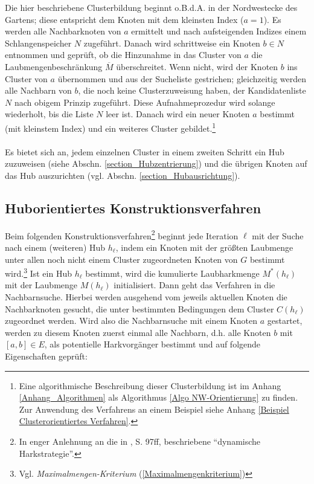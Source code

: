 \documentclass[fontsize=12pt,doubleside,openany,listof=totoc,listof=flat,listof=nochaptergap,numbers=noenddot]{scrbook}
\theoremstyle{style}
\begin{document}
Die hier beschriebene Clusterbildung beginnt o.B.d.A. in der Nordwestecke des Gartens; diese entspricht dem Knoten mit dem kleinsten Index ($a=1$). Es werden alle Nachbarknoten von $a$ ermittelt und nach aufsteigenden Indizes einem Schlangenspeicher $N$ zugeführt. Danach wird schrittweise ein Knoten $b \in N$ entnommen und geprüft, ob die Hinzunahme in das Cluster von $a$ die Laubmengenbeschränkung $\overline{M}$ überschreitet. Wenn nicht, wird der Knoten $b$ ins Cluster von $a$ übernommen und aus der Sucheliste gestrichen; gleichzeitig werden alle Nachbarn von $b$, die noch keine Clusterzuweisung haben, der Kandidatenliste $N$ nach obigem Prinzip zugeführt. Diese Aufnahmeprozedur wird solange wiederholt, bis die Liste $N$ leer ist. Danach wird ein neuer Knoten $a$ bestimmt (mit kleinstem Index) und ein weiteres Cluster gebildet.\footnote{Eine algorithmische Beschreibung dieser Clusterbildung ist im Anhang \ref{Anhang_Algorithmen} als Algorithmus \ref{Algo NW-Orientierung} zu finden. Zur Anwendung des Verfahrens an einem Beispiel siehe Anhang \ref{Beispiel Clusterorientiertes Verfahren}.}\\
\\
Es bietet sich an, jedem einzelnen Cluster in einem zweiten Schritt ein Hub zuzuweisen (siehe Abschn. \ref{section_Hubzentrierung}) und die übrigen Knoten auf das Hub auszurichten (vgl. Abschn. \ref{section_Hubausrichtung}).

\subsection{Huborientiertes Konstruktionsverfahren}
\label{section_Huborientiertes_Konstruktionsverfahren}

Beim folgenden Konstruktionsverfahren\footnote{In enger Anlehnung an die in \cite{kruse_et_al}, S. 97ff, beschriebene "`dynamische Harkstrategie"'.} beginnt jede Iteration $\ell$ mit der Suche nach einem (weiteren) Hub $h_{\ell}$, indem ein Knoten mit der größten Laubmenge unter allen noch nicht einem Cluster zugeordneten Knoten von $G$ bestimmt wird.\footnote{Vgl. \textit{Maximalmengen-Kriterium} (\ref{Maximalmengenkriterium})} Ist ein Hub $h_{\ell}$ bestimmt, wird die kumulierte Laubharkmenge $M^*(h_{\ell})$ mit der Laubmenge $M(h_{\ell})$ initialisiert. Dann geht das Verfahren in die Nachbarnsuche. Hierbei werden ausgehend vom jeweils aktuellen Knoten die Nachbarknoten gesucht, die unter bestimmten Bedingungen dem Cluster $C(h_{\ell})$ zugeordnet werden. Wird also die Nachbarnsuche mit einem Knoten $a$ gestartet, werden zu diesem Knoten zuerst einmal alle Nachbarn, d.h. alle Knoten $b$ mit $[a,b] \in E$, als potentielle Harkvorgänger bestimmt und auf folgende Eigenschaften geprüft:
\end{document}
